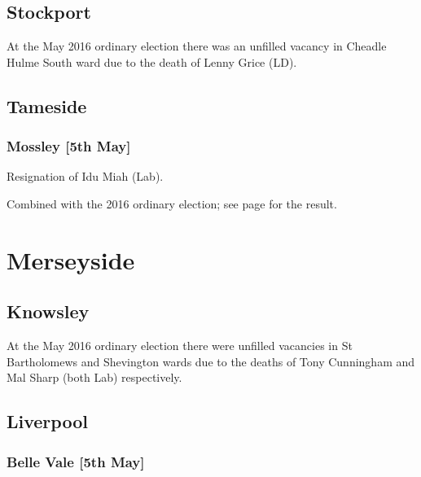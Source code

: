\documentclass[a4paper,openany]{book}
\begin{document}
\begin{resultsiii}
\subsection*{Stockport}

At the May 2016 ordinary election there was an unfilled vacancy in Cheadle Hulme South ward due to the death of Lenny Grice (LD).

\subsection*{Tameside}

\subsubsection*{Mossley \hspace*{\fill}\nolinebreak[1]%
\enspace\hspace*{\fill}
[5th May]}


Resignation of Idu Miah (Lab).

Combined with the 2016 ordinary election; see page \pageref{MossleyTameside} for the result.

\section{Merseyside}

\subsection*{Knowsley}

At the May 2016 ordinary election there were unfilled vacancies in St Bartholomews and Shevington wards due to the deaths of Tony Cunningham and Mal Sharp (both Lab) respectively.%
%

\subsection*{Liverpool}

\subsubsection*{Belle Vale \hspace*{\fill}\nolinebreak[1]%
\enspace\hspace*{\fill}
[5th May]}


\end{resultsiii}
\end{document}

